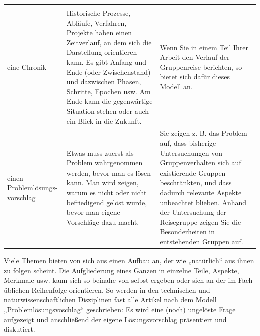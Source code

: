 \documentclass[]{book}
\theoremstyle{definition}
\theoremstyle{definition}
\theoremstyle{definition}
\theoremstyle{remark}
\begin{document}
\begin{longtable}[]{@{}lll@{}}
\begin{minipage}[t]{0.41\columnwidth}
\end{minipage}\tabularnewline
\begin{minipage}[t]{0.14\columnwidth}\raggedright\strut
eine Chronik\strut
\end{minipage} & \begin{minipage}[t]{0.36\columnwidth}\raggedright\strut
Historische Prozesse, Abläufe, Verfahren, Projekte haben einen
Zeitverlauf, an dem sich die Darstellung orientieren kann. Es gibt
Anfang und Ende (oder Zwischenstand) und dazwischen Phasen, Schritte,
Epochen usw. Am Ende kann die gegenwärtige Situation stehen oder auch
ein Blick in die Zukunft.\strut
\end{minipage} & \begin{minipage}[t]{0.41\columnwidth}\raggedright\strut
Wenn Sie in einem Teil Ihrer Arbeit den Verlauf der Gruppenreise
berichten, so bietet sich dafür dieses Modell an. \vspace{-6mm}\strut
\end{minipage}\tabularnewline
\begin{minipage}[t]{0.14\columnwidth}\raggedright\strut
einen Problemlösungs-vorschlag\strut
\end{minipage} & \begin{minipage}[t]{0.36\columnwidth}\raggedright\strut
Etwas muss zuerst als Problem wahrgenommen werden, bevor man es lösen
kann. Man wird zeigen, warum es nicht oder nicht befriedigend gelöst
wurde, bevor man eigene Vorschläge dazu macht.\strut
\end{minipage} & \begin{minipage}[t]{0.41\columnwidth}\raggedright\strut
Sie zeigen z. B. das Problem auf, dass bisherige Untersuchungen von
Gruppenverhalten sich auf existierende Gruppen beschränkten, und dass
dadurch relevante Aspekte unbeachtet blieben. Anhand der Untersuchung
der Reisegruppe zeigen Sie die Besonderheiten in entstehenden Gruppen
auf.\strut
\end{minipage}\tabularnewline
\bottomrule
\end{longtable}

Viele Themen bieten von sich aus einen Aufbau an, der wie „natürlich``
aus ihnen zu folgen scheint. Die Aufgliederung eines Ganzen in einzelne
Teile, Aspekte, Merkmale usw. kann sich so beinahe von selbst ergeben
oder sich an der im Fach üblichen Reihenfolge orientieren. So werden in
den technischen und naturwissenschaftlichen Disziplinen fast alle
Artikel nach dem Modell „Problemlösungsvoschlag`` geschrieben: Es wird
eine (noch) ungelöste Frage aufgezeigt und anschließend der eigene
Lösungsvorschlag präsentiert und diskutiert.
\end{document}
